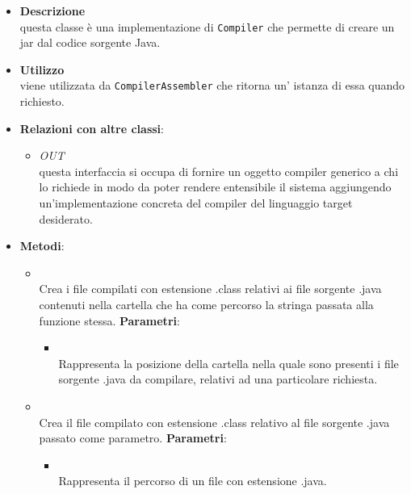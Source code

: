\begin{itemize}
\item \textbf{Descrizione}\\
questa classe è una implementazione di \texttt{Compiler} che permette di creare un jar dal codice sorgente Java.
\item \textbf{Utilizzo}\\
viene utilizzata da \texttt{CompilerAssembler} che ritorna un' istanza di essa quando richiesto.
\item \textbf{Relazioni con altre classi}:
\begin{itemize}
\item \textit{OUT} \hyperref[\nogloxy{swedesigner::server::compiler::Compiler}]{}\\
questa interfaccia si occupa di fornire un oggetto compiler generico a chi lo richiede in modo da poter rendere entensibile il sistema aggiungendo un'implementazione concreta del compiler del linguaggio target desiderato.
\end{itemize}
\item \textbf{Metodi}:
\begin{itemize}
\item {}
\\ Crea i file compilati con estensione .class relativi ai file sorgente .java contenuti nella cartella che ha come percorso la stringa passata alla funzione stessa.
\textbf{Parametri}:
\begin{itemize}
\item {}
\\ Rappresenta la posizione della cartella nella quale sono presenti i file sorgente .java da compilare, relativi ad una particolare richiesta.
\end{itemize}
\item {}
\\ Crea il file compilato con estensione .class relativo al file sorgente .java passato come parametro.
\textbf{Parametri}:
\begin{itemize}
\item {}
\\ Rappresenta il percorso di un file con estensione .java.
\end{itemize}
\end{itemize}
\end{itemize}
\subsection{}
\label{\nogloxy{swedesigner::server::controller}}
